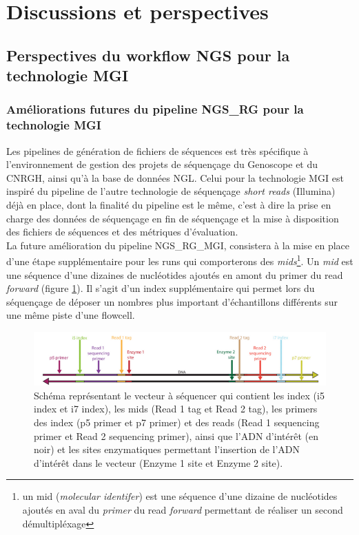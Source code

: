 \section{Discussions et perspectives}
\subsection{Perspectives du workflow NGS pour la technologie MGI}

\subsubsection{Améliorations futures du pipeline NGS\_RG pour la technologie MGI}
Les pipelines de génération de fichiers de séquences est très spécifique à l'environnement de gestion des projets de séquençage du Genoscope et du CNRGH, ainsi qu'à la base de données NGL. Celui pour la technologie MGI est inspiré du pipeline de l'autre technologie de séquençage \emph{short reads} (Illumina) déjà en place, dont la finalité du pipeline est le même, c'est à dire la prise en charge des données de séquençage en fin de séquençage et la mise à disposition des fichiers de séquences et des métriques d'évaluation.\\

La future amélioration du pipeline NGS\_RG\_MGI, consistera à la mise en place d'une étape supplémentaire pour les runs qui comporterons des \emph{mids}\footnote{un mid (\emph{molecular identifer}) est une séquence d'une dizaine de nucléotides ajoutés en aval du \emph{primer} du read \emph{forward} permettant de réaliser un second démultipléxage}. 
Un \emph{mid} est une séquence d'une dizaines de nucléotides ajoutés en amont du primer du read \emph{forward} (figure \ref{schema-mid}). Il s'agit d'un index supplémentaire qui permet lors du séquençage de déposer un nombres plus important d'échantillons différents sur une même piste d'une flowcell. 

\begin{figure}[H]
    \centering
    \includegraphics[width=1\textwidth]{img/schema-reads-index-mids.png}
    \caption{\footnotesize{Schéma représentant le vecteur à séquencer qui contient les index (i5 index et i7 index), les mids (Read 1 tag et Read 2 tag), les primers des index (p5 primer et p7 primer) et des reads (Read 1 sequencing primer et Read 2 sequencing primer), ainsi que l'ADN d'intérêt (en noir) et les sites enzymatiques permettant l'insertion de l'ADN d'intérêt dans le vecteur (Enzyme 1 site et Enzyme 2 site).}}
    \label{schema-mid}
\end{figure}

